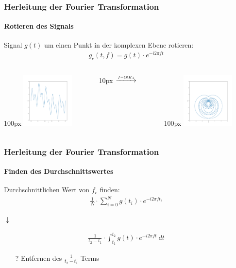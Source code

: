 \begin{frame}
    \frametitle{Herleitung der Fourier Transformation}
    \framesubtitle{Rotieren des Signals}

    Signal  $g(t)$ um einen Punkt in der komplexen Ebene rotieren:
    \begin{align*}
        g_c(t, f)=g(t)\cdot e^{-i2\pi f t}
    \end{align*}
    \begin{center}
        \begin{columns}[c]
    \begin{column}{100px}
        \includegraphics[width=100px]{images/01-what-is-fourier-signal.png}
    \end{column}
    \hspace*{-45px}
    \begin{column}{10px}
        $\overset{\scriptscriptstyle{f=10Hz}}{\parbox{1.1cm}{\rightarrowfill}}$
    \end{column}
    \hspace*{-20px}
    \begin{column}{100px}
        \includegraphics[width=100px]{images/02-deriving-fourier_wrapped_signal.png}
    \end{column}
    \end{columns}
    \end{center}
\end{frame}

\begin{frame}
    \frametitle{Herleitung der Fourier Transformation}
    \framesubtitle{Finden des Durchschnittswertes}
    Durchschnittlichen Wert von $f_c$ finden:
    \begin{align*}
    \frac{1}{N}\cdot \sum_{i=0}^{N}{g(t_i)\cdot e^{-i2\pi f t_i}}
    \end{align*}
    \begin{center}
    $\downarrow$ 
\end{center}
    \begin{align*}
        \frac{1}{t_2-t_1}\cdot \int_{t_1}^{t_2}{g(t)\cdot e^{-i2\pi f t}\ dt}
    \end{align*}
    \begin{itemize}
        \item[?]Entfernen des $\frac{1}{t_2-t_1}$ Terms 
    \end{itemize}
\end{frame}

